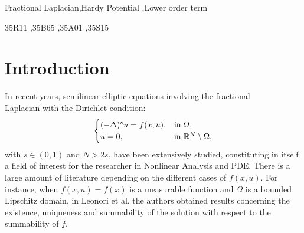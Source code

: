 \documentclass[preprint,12pt]{elsarticle}
\begin{document}
\begin{frontmatter}
		
		
		\begin{keyword}
			Fractional Laplacian\sep Hardy Potential \sep Lower order term
			
			
			\MSC[2020] 35R11 \sep 35B65 \sep 35A01 \sep 35S15
			
		\end{keyword}
		
	\end{frontmatter}
	
		
		
		\section{Introduction}
		
		In recent years, semilinear elliptic equations involving the fractional \\Laplacian with the Dirichlet condition:
		\begin{equation}\label{problemaa}
			\begin{cases}
				\displaystyle(-\Delta)^s u = f(x,u), &  \text{in $\Omega$,}\\
				\mathnormal{u}=0, & \text{in $\mathbb{R}^N\setminus\Omega$,}
			\end{cases}
		\end{equation}
		with $s\in (0,1)$ and $N>2s$, have been extensively studied, constituting in itself a field of interest for the researcher in Nonlinear Analysis and PDE. There is a large amount of literature depending on the different cases of $f(x,u)$. For instance, when
		$f(x,u)=f(x)$  is a measurable function and $\Omega$ is a bounded Lipschitz domain, in Leonori et al. \cite{Leonori} the authors obtained results concerning the existence, uniqueness and summability of the solution with respect to the summability of $f$.
		
\end{document}
